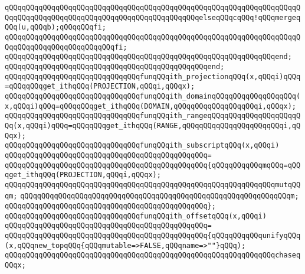 \verb|qQQqqQQqqQQqqQQqqQQqqQQqqQQqqQQqqQQqqQQqqQQqqQQqqQQqqQQqqQQqqQQqqQQqqQQqqQQqqQQqqQQqqQQqqQQqqQQqqQQqqQQqqQQqqQQqqQQqelseqQQqcqQQq!qQQqmergeqQQq(u,qQQqb);qQQqqQQqfi;|\newline
\verb|qQQqqQQqqQQqqQQqqQQqqQQqqQQqqQQqqQQqqQQqqQQqqQQqqQQqqQQqqQQqqQQqqQQqqQQqqQQqqQQqqQQqqQQqqQQqqQQqfi;|\newline
\verb|qQQqqQQqqQQqqQQqqQQqqQQqqQQqqQQqqQQqqQQqqQQqqQQqqQQqqQQqqQQqqQQqend;|\newline
\verb|qQQqqQQqqQQqqQQqqQQqqQQqqQQqqQQqqQQqqQQqqQQqqQQqend;|\newline
\newline
\verb|qQQqqQQqqQQqqQQqqQQqqQQqqQQqqQQqfunqQQqith_projectionqQQq(x,qQQqi)qQQq=qQQqqQQqget_ithqQQq(PROJECTION,qQQqi,qQQqx);|\newline
\verb|qQQqqQQqqQQqqQQqqQQqqQQqqQQqqQQqfunqQQqith_domainqQQqqQQqqQQqqQQqqQQq(x,qQQqi)qQQq=qQQqqQQqget_ithqQQq(DOMAIN,qQQqqQQqqQQqqQQqqQQqi,qQQqx);|\newline
\verb|qQQqqQQqqQQqqQQqqQQqqQQqqQQqqQQqfunqQQqith_rangeqQQqqQQqqQQqqQQqqQQqqQQq(x,qQQqi)qQQq=qQQqqQQqget_ithqQQq(RANGE,qQQqqQQqqQQqqQQqqQQqqQQqi,qQQqx);|\newline
\newline
\verb|qQQqqQQqqQQqqQQqqQQqqQQqqQQqqQQqfunqQQqith_subscriptqQQq(x,qQQqi)|\newline
\verb|qQQqqQQqqQQqqQQqqQQqqQQqqQQqqQQqqQQqqQQqqQQqqQQq=|\newline
\verb|qQQqqQQqqQQqqQQqqQQqqQQqqQQqqQQqqQQqqQQqqQQqqQQq{qQQqqQQqqQQqmqQQq=qQQqget_ithqQQq(PROJECTION,qQQqi,qQQqx);|\newline
\verb|qQQqqQQqqQQqqQQqqQQqqQQqqQQqqQQqqQQqqQQqqQQqqQQqqQQqqQQqqQQqqQQqmutqQQqm;|\newline
\verb|qQQqqQQqqQQqqQQqqQQqqQQqqQQqqQQqqQQqqQQqqQQqqQQqqQQqqQQqqQQqqQQqm;|\newline
\verb|qQQqqQQqqQQqqQQqqQQqqQQqqQQqqQQqqQQqqQQqqQQqqQQq};|\newline
\newline
\verb|qQQqqQQqqQQqqQQqqQQqqQQqqQQqqQQqfunqQQqith_offsetqQQq(x,qQQqi)|\newline
\verb|qQQqqQQqqQQqqQQqqQQqqQQqqQQqqQQqqQQqqQQqqQQqqQQq=|\newline
\verb|qQQqqQQqqQQqqQQqqQQqqQQqqQQqqQQqqQQqqQQqqQQqqQQq{qQQqqQQqqQQqunifyqQQq(x,qQQqnew_topqQQq{qQQqmutable=>FALSE,qQQqname=>""}qQQq);|\newline
\verb|qQQqqQQqqQQqqQQqqQQqqQQqqQQqqQQqqQQqqQQqqQQqqQQqqQQqqQQqqQQqqQQqchaseqQQqx;|\newline
